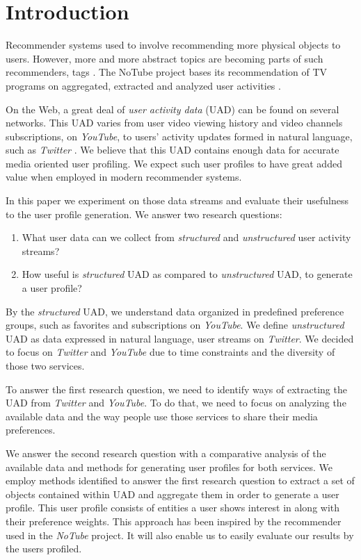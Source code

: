 \section{Introduction}

Recommender systems used to involve recommending more physical objects \cite{combining-cf-with-pa} to users.
However, more and more abstract topics are becoming parts of such recommenders, \eg tags \cite{accuracy-recommending}.
The NoTube project bases its recommendation of TV programs on aggregated, extracted and analyzed user activities
\cite{notube-main}.

On the Web, a great deal of \textit{user activity data} (UAD) can be found on several networks. This UAD varies from user
video viewing history and video channels subscriptions, \eg on \textit{YouTube}, to users' activity updates formed
in natural language, such as \textit{Twitter} \cite{why-we-twitter}. We believe that this UAD contains enough
data for accurate media oriented user profiling. We expect such user profiles to have great added value when
employed in modern recommender systems.

In this paper we experiment on those data streams and evaluate their usefulness to the user profile generation. We answer
two research questions:
\begin{enumerate}
  \item What user data can we collect from \textit{structured} and \textit{unstructured} user activity streams?
  \item How useful is \textit{structured} UAD as compared to \textit{unstructured} UAD, to generate a user profile?
\end{enumerate}

By the \textit{structured} UAD, we understand data organized in predefined
preference groups, such as favorites and subscriptions on \textit{YouTube}.
We define \textit{unstructured} UAD as data expressed in natural language, \eg user streams on \textit{Twitter}.
We decided to focus on \textit{Twitter} and \textit{YouTube} due to time constraints and the diversity of those two
services.

To answer the first research question, we need to identify ways of extracting the UAD from \textit{Twitter}
and \textit{YouTube}. To do that, we need to focus on analyzing the available data and the way people use
those services to share their media preferences.

We answer the second research question with a comparative analysis of the available data and
methods for generating user profiles for both services. We employ methods identified to answer the
first research question to extract a set of objects contained within UAD and aggregate them
in order to generate a user profile. This user profile consists of entities a user shows interest in
along with their preference weights. This approach has been inspired by the recommender used in the
\textit{NoTube} project. It will also enable us to easily evaluate our results by the users profiled.

